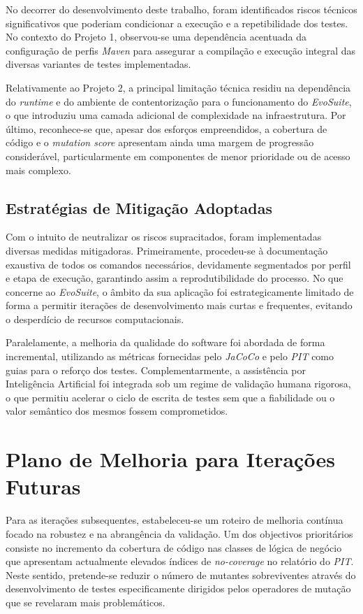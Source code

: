 \documentclass{article}
\begin{document}
No decorrer do desenvolvimento deste trabalho, foram identificados riscos técnicos significativos que poderiam condicionar a execução e a repetibilidade dos testes. No contexto do Projeto 1, observou-se uma dependência acentuada da configuração de perfis \emph{Maven} para assegurar a compilação e execução integral das diversas variantes de testes implementadas. 

Relativamente ao Projeto 2, a principal limitação técnica residiu na dependência do \emph{runtime} e do ambiente de contentorização para o funcionamento do \emph{EvoSuite}, o que introduziu uma camada adicional de complexidade na infraestrutura. Por último, reconhece-se que, apesar dos esforços empreendidos, a cobertura de código e o \emph{mutation score} apresentam ainda uma margem de progressão considerável, particularmente em componentes de menor prioridade ou de acesso mais complexo.

\subsection{Estratégias de Mitigação Adoptadas}

Com o intuito de neutralizar os riscos supracitados, foram implementadas diversas medidas mitigadoras. Primeiramente, procedeu-se à documentação exaustiva de todos os comandos necessários, devidamente segmentados por perfil e etapa de execução, garantindo assim a reprodutibilidade do processo. No que concerne ao \emph{EvoSuite}, o âmbito da sua aplicação foi estrategicamente limitado de forma a permitir iterações de desenvolvimento mais curtas e frequentes, evitando o desperdício de recursos computacionais.

Paralelamente, a melhoria da qualidade do software foi abordada de forma incremental, utilizando as métricas fornecidas pelo \emph{JaCoCo} e pelo \emph{PIT} como guias para o reforço dos testes. Complementarmente, a assistência por Inteligência Artificial foi integrada sob um regime de validação humana rigorosa, o que permitiu acelerar o ciclo de escrita de testes sem que a fiabilidade ou o valor semântico dos mesmos fossem comprometidos.

\section{Plano de Melhoria para Iterações Futuras}

Para as iterações subsequentes, estabeleceu-se um roteiro de melhoria contínua focado na robustez e na abrangência da validação. Um dos objectivos prioritários consiste no incremento da cobertura de código nas classes de lógica de negócio que apresentam actualmente elevados índices de \emph{no-coverage} no relatório do \emph{PIT}. Neste sentido, pretende-se reduzir o número de mutantes sobreviventes através do desenvolvimento de testes especificamente dirigidos pelos operadores de mutação que se revelaram mais problemáticos.
\end{document}
